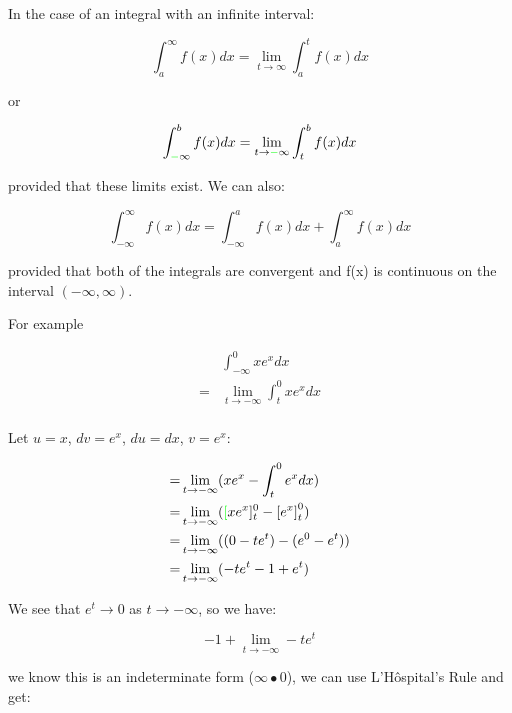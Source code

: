 \documentclass{article}
\newenvironment{correction}
{\color{green}}
{}
\begin{document}
In the case of an integral with an infinite interval:

\[
\int^\infty_a f(x)dx = \lim_{t \to \infty} \int^t_a f(x)dx
\]

or

\[
\int^b_{\begin{correction}-\end{correction}\infty} f(x)dx = \lim_{t \to \begin{correction}-\end{correction}\infty} \int^b_t f(x)dx
\]

provided that these limits exist.  We can also:

\[
\int^\infty_{-\infty} f(x)dx = \int^a_{-\infty}f(x)dx + \int^\infty_a f(x)dx
\]

provided that both of the integrals are convergent \begin{correction}and f(x) is continuous on the interval $(-\infty,\infty)$\end{correction}.

For example

\begin{align*}
  &\int^0_{-\infty} x e^x dx \\
  = &\lim_{t \to -\infty} \int^0_t x e^x dx \\
\end{align*}

Let $u = x$, $dv = e^x$, $du = dx$, $v = e^x$:

\begin{align*}
  = &\lim_{t \to -\infty} (x e^x - \int^0_t e^x dx) \\
  = &\lim_{t \to -\infty} (\begin{correction}[\end{correction}xe^x]^0_t - \left[ e^x \right]^0_t) \\
  = &\lim_{t \to -\infty} ((0 - te^t) - (e^0 - e^t)) \\
  = &\lim_{t \to -\infty} (-te^t - 1 + e^t) \\
\end{align*}

\newpage

We see that $e^t \to 0$ as $t \to -\infty$, so we have:

\begin{displaymath}
  -1 + \lim_{t \to -\infty} -te^t 
\end{displaymath}

we know this is an indeterminate form ($\infty \bullet 0$), we
can use L'H\^{o}spital's Rule and get:
\end{document}

